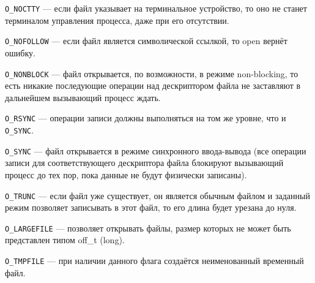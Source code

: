 \documentclass[12pt]{report}
\begin{document}
\texttt{O\_NOCTTY} --- если файл указывает на терминальное устройство, то оно не станет терминалом управления процесса, даже при его отсутствии.

\texttt{O\_NOFOLLOW} --- если файл является символической ссылкой, то open вернёт ошибку.

\texttt{O\_NONBLOCK} --- файл открывается, по возможности, в режиме non-blocking, то есть никакие последующие операции над дескриптором файла не заставляют в дальнейшем вызывающий процесс ждать.

\texttt{O\_RSYNC} --- операции записи должны выполняться на том же уровне, что и \texttt{O\_SYNC}.

\texttt{O\_SYNC} --- файл открывается в режиме синхронного ввода-вывода (все операции записи для соответствующего дескриптора файла блокируют вызывающий процесс до тех пор, пока данные не будут физически записаны).

\texttt{O\_TRUNC} --- если файл уже существует, он является обычным файлом и заданный режим позволяет записывать в этот файл, то его длина будет урезана до нуля.

\texttt{O\_LARGEFILE} --- позволяет открывать файлы, размер которых не может быть представлен типом off\_t (long).

\texttt{O\_TMPFILE} --- при наличии данного флага создаётся неименованный временный файл.
\end{document}
